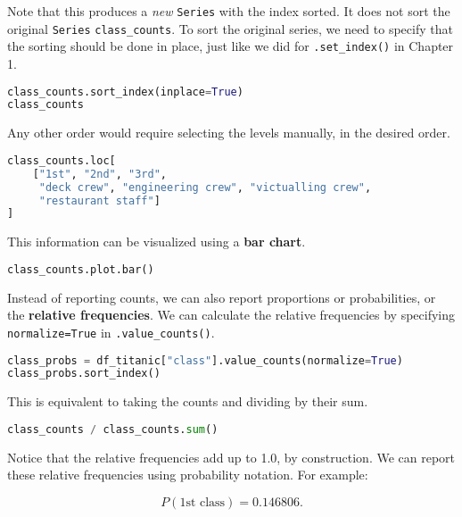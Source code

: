 Note that this produces a \textit{new} \verb|Series| with the index sorted. It does not sort the original \verb|Series| \verb|class_counts|. To sort the original series, we need to specify that the sorting should be done in place, just like we did for \verb|.set_index()| in Chapter 1.

\begin{lstlisting}[language=Python]
class_counts.sort_index(inplace=True)
class_counts
\end{lstlisting}




Any other order would require selecting the levels manually, in the desired order.

\begin{lstlisting}[language=Python]
class_counts.loc[
    ["1st", "2nd", "3rd",
     "deck crew", "engineering crew", "victualling crew",
     "restaurant staff"]
]
\end{lstlisting}




This information can be visualized using a \textbf{bar chart}.

\begin{lstlisting}[language=Python]
class_counts.plot.bar()
\end{lstlisting}




Instead of reporting counts, we can also report proportions or probabilities, or the \textbf{relative frequencies}. We can calculate the relative frequencies by specifying \verb|normalize=True| in \verb|.value_counts()|.

\begin{lstlisting}[language=Python]
class_probs = df_titanic["class"].value_counts(normalize=True)
class_probs.sort_index()
\end{lstlisting}




This is equivalent to taking the counts and dividing by their sum.

\begin{lstlisting}[language=Python]
class_counts / class_counts.sum()
\end{lstlisting}




Notice that the relative frequencies add up to 1.0, by construction. We can report these relative frequencies using probability notation. For example:

$$ P(\text{1st class}) = 0.146806. $$

